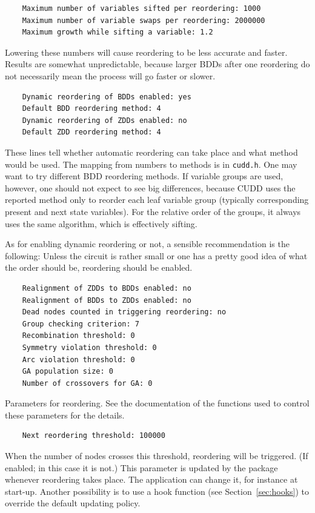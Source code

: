\documentclass[11pt]{article}
\begin{document}
\begin{verbatim}
    Maximum number of variables sifted per reordering: 1000
    Maximum number of variable swaps per reordering: 2000000
    Maximum growth while sifting a variable: 1.2
\end{verbatim}
Lowering these numbers will cause reordering to be less accurate and
faster. Results are somewhat unpredictable, because larger BDDs after one
reordering do not necessarily mean the process will go faster or slower.

\begin{verbatim}
    Dynamic reordering of BDDs enabled: yes
    Default BDD reordering method: 4
    Dynamic reordering of ZDDs enabled: no
    Default ZDD reordering method: 4
\end{verbatim}
These lines tell whether automatic reordering can take place and what
method would be used.  The mapping from numbers to methods is in
\texttt{cudd.h}.  One may want to try different BDD reordering
methods.  If variable groups are used, however, one should not expect
to see big differences, because CUDD uses the reported method only to
reorder each leaf variable group (typically corresponding present and
next state variables).  For the relative order of the groups, it
always uses the same algorithm, which is effectively sifting.

As for enabling dynamic reordering or not, a sensible recommendation is the
following: Unless the circuit is rather small or one has a pretty good
idea of what the order should be, reordering should be enabled.

\begin{verbatim}
    Realignment of ZDDs to BDDs enabled: no
    Realignment of BDDs to ZDDs enabled: no
    Dead nodes counted in triggering reordering: no
    Group checking criterion: 7
    Recombination threshold: 0
    Symmetry violation threshold: 0
    Arc violation threshold: 0
    GA population size: 0
    Number of crossovers for GA: 0
\end{verbatim}
Parameters for reordering. See the documentation of the functions used
to control these parameters for the details.

\begin{verbatim}
    Next reordering threshold: 100000
\end{verbatim}
When the number of nodes crosses this threshold, reordering will be
triggered. (If enabled; in this case it is not.)  This parameter is
updated by the package whenever reordering takes place.  The
application can change it, for instance at start-up.  Another
possibility is to use a hook function (see Section~\ref{sec:hooks}) to
override the default updating policy.
\end{document}
